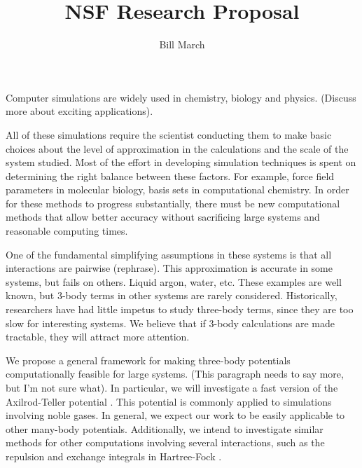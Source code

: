 \documentclass[twoside,leqno, 12pt]{article}
\title{NSF Research Proposal}
\author{Bill March}
\date{}                                           %
\begin{document}
\maketitle


Computer simulations are widely used in chemistry, biology and physics.  (Discuss more about exciting applications).  

All of these simulations require the scientist conducting them to make basic choices about the level of approximation in the calculations and the scale of the system studied.  Most of the effort in developing simulation techniques is spent on determining the right balance between these factors.  For example, force field parameters in molecular biology, basis sets in computational chemistry.  In order for these methods to progress substantially, there must be new computational methods that allow better accuracy without sacrificing large systems and reasonable computing times.  

One of the fundamental simplifying assumptions in these systems is that all interactions are pairwise (rephrase).  This approximation is accurate in some systems, but fails on others.  Liquid argon, water, etc.  These examples are well known, but 3-body terms in other systems are rarely considered.  Historically, researchers have had little impetus to study three-body terms, since they are too slow for interesting systems.  We believe that if 3-body calculations are made tractable, they will attract more attention.

We propose a general framework for making three-body potentials computationally feasible for large systems.  (This paragraph needs to say more, but I'm not sure what).  In particular, we will investigate a fast version of the Axilrod-Teller potential \cite{axilrod_teller}.  This potential is commonly applied to simulations involving noble gases.  In general, we expect our work to be easily applicable to other many-body potentials.  Additionally, we intend to investigate similar methods for other computations involving several interactions, such as the repulsion and exchange integrals in Hartree-Fock \cite{Leach:2001rt}.
\end{document}
